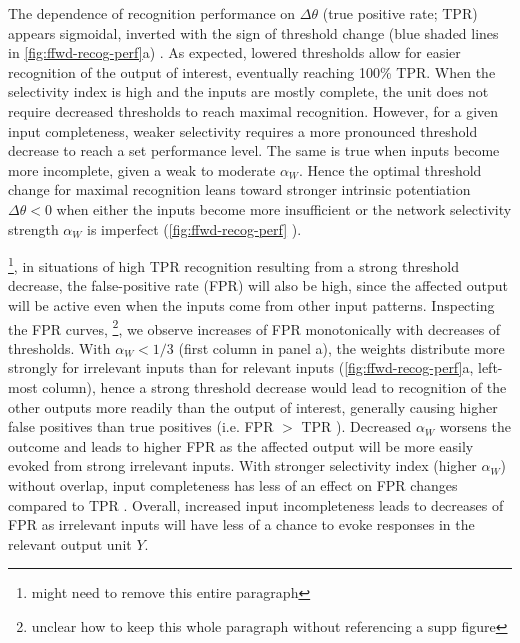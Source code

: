 The dependence of recognition performance on $\Delta\theta$ (true positive rate; TPR)
    appears sigmoidal, inverted with the sign of threshold change
        (blue shaded lines in \autoref{fig:ffwd-recog-perf}a)
        .
    As expected, lowered thresholds allow for easier recognition of the output of interest, eventually reaching 100\% TPR.
    When the selectivity index is high and the inputs are mostly complete, the unit does not require decreased thresholds to reach maximal recognition.
    However, for a given input completeness, weaker selectivity requires a more pronounced threshold decrease to reach a set performance level.
    The same is true when inputs become more incomplete, given a weak to moderate $\alpha_W$.
    Hence the optimal threshold change for maximal recognition leans toward stronger intrinsic potentiation $\Delta \theta < 0$
        when either the inputs become more insufficient or the network selectivity strength $\alpha_W$ is imperfect (\autoref{fig:ffwd-recog-perf}
        ).

\footnote{might need to remove this entire paragraph},
    in situations of high TPR recognition resulting from a strong threshold decrease,
        the false-positive rate (FPR) will also be high,
        since the affected output will be active even when the inputs come from other input patterns.
    Inspecting the FPR curves,
        \footnote{unclear how to keep this whole paragraph without referencing a supp figure},
        we observe increases of FPR monotonically with decreases of thresholds.
    With $\alpha_W < 1/3$ (first column in panel a), the weights distribute more strongly for irrelevant inputs than for relevant inputs
        (\autoref{fig:ffwd-recog-perf}a, left-most column),
        hence a strong threshold decrease would lead to recognition of the other outputs more readily than the output of interest,
        generally causing higher false positives than true positives
        (i.e. FPR $>$ TPR
        ).
    Decreased $\alpha_W$ worsens the outcome and leads to higher FPR
        as the affected output will be more easily evoked from strong irrelevant inputs.
    With stronger selectivity index (higher $\alpha_W$) without overlap,
        input completeness has less of an effect on FPR changes compared to TPR
        .
    Overall, increased input incompleteness leads to decreases of FPR
        as irrelevant inputs will have less of a chance to evoke responses in the relevant output unit $Y$.

